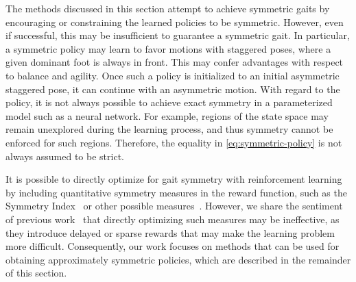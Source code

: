 The methods discussed in this section attempt to achieve symmetric gaits by encouraging or constraining 
the learned policies to be symmetric. However, even if successful, this may be insufficient to guarantee a symmetric gait.  
In particular, a symmetric policy may learn to favor motions with staggered poses, where a given dominant foot is always in front.
This may confer advantages with respect to balance and agility.  
Once  such a policy is initialized to an initial asymmetric staggered pose, it can continue
with an asymmetric motion.
With regard to the policy, it is not always possible to achieve exact symmetry in a parameterized model 
such as a neural network.  For example, regions of the state space may remain unexplored 
during the learning process, and thus symmetry cannot be enforced for such regions.  
Therefore, the equality in \autoref{eq:symmetric-policy} is not always assumed to be strict.

It is possible to directly optimize for gait symmetry with reinforcement learning by 
including quantitative symmetry measures in the reward function, such as the Symmetry Index~\citep{robinson1987use} 
or other possible measures~\citep{symmetry_measures}. However, we share the sentiment 
of previous work~\citep{Yu-SIGGRAPH-2018} that directly optimizing such measures 
may be ineffective, as they introduce delayed or sparse rewards that may make the learning problem more difficult.  
Consequently, our work focuses on methods that can be used for obtaining approximately 
symmetric policies, which are described in the remainder of this section.




